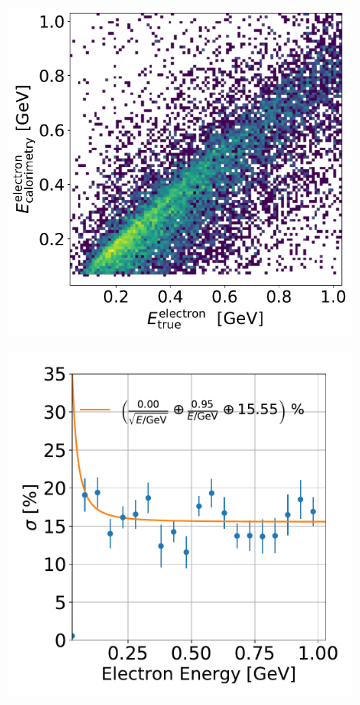\begin{figure}[H] 
\begin{center}
    \begin{subfigure}[b]{0.4\textwidth}
    \centering
    \includegraphics[width=1.00\textwidth]{ereco/electron_eres2D.pdf}
    \end{subfigure}
    \begin{subfigure}[b]{0.38\textwidth}
    \centering
    \includegraphics[width=1.00\textwidth]{ereco/elec_eres_vs_true.pdf}

\end{subfigure}
\end{center}
\end{figure}
